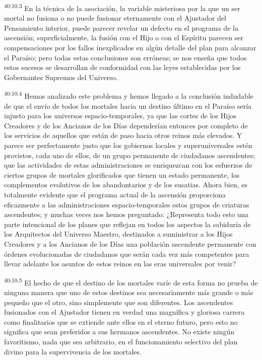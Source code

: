 \par
\textsuperscript{40:10.3} En la técnica de la asociación, la variable misteriosa por la que un ser mortal no fusiona o no puede fusionar eternamente con el Ajustador del Pensamiento interior, puede parecer revelar un defecto en el programa de la ascensión; superficialmente, la fusión con el Hijo o con el Espíritu parecen ser compensaciones por los fallos inexplicados en algún detalle del plan para alcanzar el Paraíso; pero todas estas conclusiones son erróneas; se nos enseña que todos estos sucesos se desarrollan de conformidad con las leyes establecidas por los Gobernantes Supremos del Universo.

\par
\textsuperscript{40:10.4} Hemos analizado este problema y hemos llegado a la conclusión indudable de que el envío de todos los mortales hacia un destino último en el Paraíso sería injusto para los universos espacio-temporales, ya que las cortes de los Hijos Creadores y de los Ancianos de los Días dependerían entonces por completo de los servicios de aquellos que están de paso hacia otros reinos más elevados. Y parece ser perfectamente justo que los gobiernos locales y superuniversales estén provistos, cada uno de ellos, de un grupo permanente de ciudadanos ascendentes; que las actividades de estas administraciones se enriquezcan con los esfuerzos de ciertos grupos de mortales glorificados que tienen un estado permanente, los complementos evolutivos de los abandontarios y de los susatias. Ahora bien, es totalmente evidente que el programa actual de la ascensión proporciona eficazmente a las administraciones espacio-temporales estos grupos de criaturas ascendentes; y muchas veces nos hemos preguntado: ¿Representa todo esto una parte intencional de los planes que reflejan en todos los aspectos la sabiduría de los Arquitectos del Universo Maestro, destinados a suministrar a los Hijos Creadores y a los Ancianos de los Días una población ascendente permanente con órdenes evolucionadas de ciudadanos que serán cada vez más competentes para llevar adelante los asuntos de estos reinos en las eras universales por venir?

\par
\textsuperscript{40:10.5} El hecho de que el destino de los mortales varíe de esta forma no prueba de ninguna manera que uno de estos destinos sea necesariamente más grande o más pequeño que el otro, sino simplemente que son diferentes. Los ascendentes fusionados con el Ajustador tienen en verdad una magnífica y gloriosa carrera como finalitarios que se extiende ante ellos en el eterno futuro, pero esto no significa que sean preferidos a sus hermanos ascendentes. No existe ningún favoritismo, nada que sea arbitrario, en el funcionamiento selectivo del plan divino para la supervivencia de los mortales.

